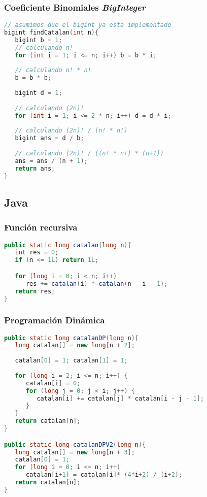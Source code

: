 \subsubsection{Coeficiente Binomiales \emph{BigInteger}}
\begin{lstlisting}[language=C++]
// asumimos que el bigint ya esta implementado	
bigint findCatalan(int n){
   bigint b = 1;
   // calculando n!
   for (int i = 1; i <= n; i++) b = b * i;
	
   // calculando n! * n!
   b = b * b;
	
   bigint d = 1;
	
   // calculando (2n)!
   for (int i = 1; i <= 2 * n; i++) d = d * i;
	
   // calculando (2n)! / (n! * n!)
   bigint ans = d / b;
	
   // calculando (2n)! / ((n! * n!) * (n+1))
   ans = ans / (n + 1);
   return ans;
}
\end{lstlisting}


\subsection{Java}

\subsubsection{Función recursiva}
\begin{lstlisting}[language=Java]
public static long catalan(long n){
   int res = 0;
   if (n <= 1L) return 1L;

   for (long i = 0; i < n; i++)
      res += catalan(i) * catalan(n - i - 1);
   return res;
}
\end{lstlisting}


\subsubsection{Programación Dinámica}
\begin{lstlisting}[language=Java]
public static long catalanDP(long n){
   long catalan[] = new long[n + 2];
	
   catalan[0] = 1; catalan[1] = 1;
   
   for (long i = 2; i <= n; i++) {
      catalan[i] = 0;
      for (long j = 0; j < i; j++) {
         catalan[i] += catalan[j] * catalan[i - j - 1];
      }
   }
   return catalan[n];
}

public static long catalanDPV2(long n){
   long catalan[] = new long[n + 3];
   catalan[0] = 1; 
   for (long i = 0; i <= n; i++)
      catalan[i+1] = catalan[i]* (4*i+2) / (i+2);
   return catalan[n];
}
\end{lstlisting}


